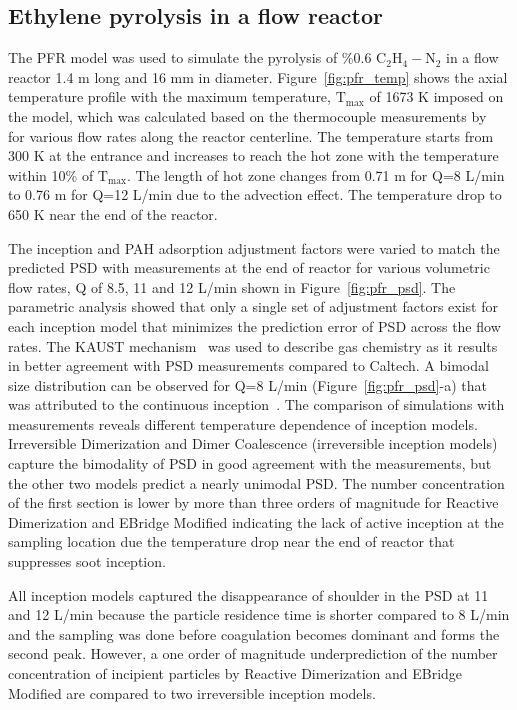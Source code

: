 \subsection{Ethylene pyrolysis in a flow reactor}
The PFR model was used to simulate the pyrolysis of \%0.6 $\mathrm{C_2H_4-N_2}$ in a flow reactor 1.4 m long and 16 mm in diameter. Figure~\ref{fig:pfr_temp} shows the axial temperature profile with the maximum temperature, $\mathrm{T_{max}}$ of 1673 K imposed on the model, which was calculated based on the thermocouple measurements by~\citet{mei2019quantitative} for various flow rates along the reactor centerline. The temperature starts from 300 K at the entrance and increases to reach the hot zone with the temperature within 10\% of $\mathrm{T_{max}}$.  The length of hot zone changes from 0.71 m for Q=8 L/min to 0.76 m for Q=12 L/min due to the advection effect. The temperature drop to 650 K near the end of the reactor. 

The inception and PAH adsorption adjustment factors were varied to match the predicted PSD with measurements at the end of reactor for various volumetric flow rates, Q of 8.5, 11 and 12 L/min shown in Figure~\ref{fig:pfr_psd}. The parametric analysis showed that only a single set of adjustment factors exist for each inception model that minimizes the prediction error of PSD across the flow rates. The KAUST mechanism~\citep{wang2013pah} was used to describe gas chemistry as it results in better agreement with PSD measurements compared to Caltech. A bimodal size distribution can be observed for Q=8 L/min (Figure~\ref{fig:pfr_psd}-a) that was attributed to the continuous inception~\citep{zhao2003measurement}. The comparison of simulations with measurements reveals different temperature dependence of inception models. Irreversible Dimerization and Dimer Coalescence (irreversible inception models) capture the bimodality of PSD in good agreement with the measurements, but the other two models predict a nearly unimodal PSD. The number concentration of the first section is lower by more than three orders of magnitude for Reactive Dimerization and EBridge Modified indicating the lack of active inception at the sampling location due the temperature drop near the end of reactor that suppresses soot inception.

All inception models captured the disappearance of shoulder in the PSD at 11 and 12 L/min because the particle residence time is shorter compared to 8 L/min and the sampling was done before coagulation becomes dominant and forms the second peak. However, a one order of magnitude underprediction of the number concentration of incipient particles by Reactive Dimerization and EBridge Modified are compared to two irreversible inception models.

